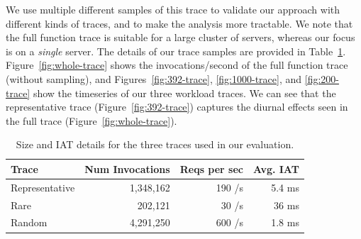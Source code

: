 
We use multiple different samples of this trace to validate our approach with different kinds of traces, and to make the analysis more tractable. We note that the full function trace is suitable for a large cluster of servers, whereas our focus is on a \emph{single} server.
The details of our trace samples are provided in Table~\ref{tab:trace-deets}. 
Figure~\ref{fig:whole-trace} shows the invocations/second of the full function trace (without sampling), and Figures~\ref{fig:392-trace}, \ref{fig:1000-trace}, and \ref{fig:200-trace} show the timeseries of our three workload traces. 
We can see that the representative trace (Figure~\ref{fig:392-trace}) captures the diurnal effects seen in the full trace (Figure~\ref{fig:whole-trace}).



\begin{table}
  \begin{tabular}{lrrr}
    \hline 
    Trace & Num Invocations & Reqs per sec & Avg. IAT \\
    \hline
    Representative & 1,348,162 & 190 /s & 5.4 ms \\
    Rare & 202,121 & 30 /s & 36 ms \\
    Random & 4,291,250 & 600 /s & 1.8 ms \\
    \hline
  \end{tabular}
  \caption{Size and IAT details for the three traces used in our evaluation.}
  \label{tab:trace-deets}
\end{table}



